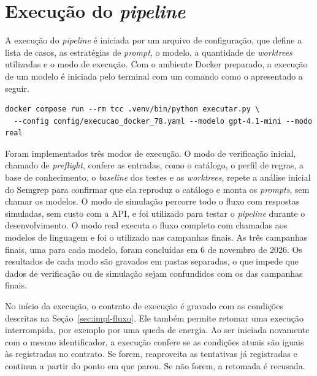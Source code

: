 \section{Execução do \textit{pipeline}}
\label{sec:impl-execucao}

A execução do \textit{pipeline} é iniciada por um arquivo de configuração, que define a lista de casos, as estratégias de \textit{prompt}, o modelo, a quantidade de \textit{worktrees} utilizadas e o modo de execução. Com o ambiente Docker preparado, a execução de um modelo é iniciada pelo terminal com um comando como o apresentado a seguir.

{\footnotesize
\begin{verbatim}
docker compose run --rm tcc .venv/bin/python executar.py \
  --config config/execucao_docker_78.yaml --modelo gpt-4.1-mini --modo real
\end{verbatim}
}

Foram implementados três modos de execução. O modo de verificação inicial, chamado de \textit{preflight}, confere as entradas, como o catálogo, o perfil de regras, a base de conhecimento, o \textit{baseline} dos testes e as \textit{worktrees}, repete a análise inicial do Semgrep para confirmar que ela reproduz o catálogo e monta os \textit{prompts}, sem chamar os modelos. O modo de simulação percorre todo o fluxo com respostas simuladas, sem custo com a API, e foi utilizado para testar o \textit{pipeline} durante o desenvolvimento. O modo real executa o fluxo completo com chamadas aos modelos de linguagem e foi o utilizado nas campanhas finais. As três campanhas finais, uma para cada modelo, foram concluídas em 6 de novembro de 2026. Os resultados de cada modo são gravados em pastas separadas, o que impede que dados de verificação ou de simulação sejam confundidos com os das campanhas finais.

No início da execução, o contrato de execução é gravado com as condições descritas na Seção~\ref{sec:impl-fluxo}. Ele também permite retomar uma execução interrompida, por exemplo por uma queda de energia. Ao ser iniciada novamente com o mesmo identificador, a execução confere se as condições atuais são iguais às registradas no contrato. Se forem, reaproveita as tentativas já registradas e continua a partir do ponto em que parou. Se não forem, a retomada é recusada.

